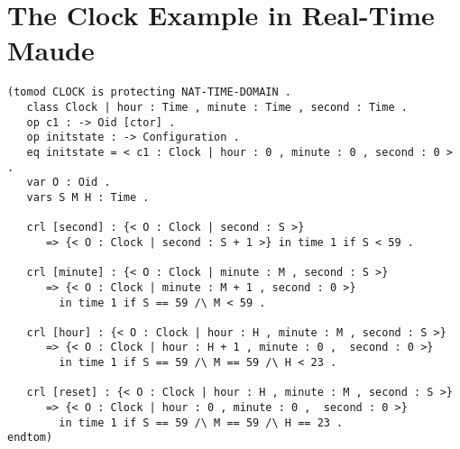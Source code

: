 \documentclass[a4paper,11pt]{report}
\begin{document}
\section*{The Clock Example in Real-Time Maude}
\label{sec:aclock}
\begin{verbatim}
(tomod CLOCK is protecting NAT-TIME-DOMAIN .
   class Clock | hour : Time , minute : Time , second : Time .
   op c1 : -> Oid [ctor] .
   op initstate : -> Configuration .
   eq initstate = < c1 : Clock | hour : 0 , minute : 0 , second : 0 > .
   var O : Oid . 
   vars S M H : Time .
	
   crl [second] : {< O : Clock | second : S >} 
      => {< O : Clock | second : S + 1 >} in time 1 if S < 59 .
			
   crl [minute] : {< O : Clock | minute : M , second : S >} 
      => {< O : Clock | minute : M + 1 , second : 0 >} 
        in time 1 if S == 59 /\ M < 59 .
				
   crl [hour] : {< O : Clock | hour : H , minute : M , second : S >} 
      => {< O : Clock | hour : H + 1 , minute : 0 ,  second : 0 >} 
        in time 1 if S == 59 /\ M == 59 /\ H < 23 .
				
   crl [reset] : {< O : Clock | hour : H , minute : M , second : S >} 
      => {< O : Clock | hour : 0 , minute : 0 ,  second : 0 >} 
        in time 1 if S == 59 /\ M == 59 /\ H == 23 .
endtom)
\end{verbatim}
\end{document}
